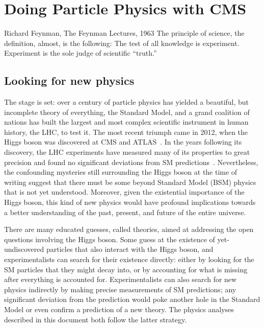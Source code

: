 \chapter{Doing Particle Physics with CMS}
\begin{aquote}{Richard Feynman, The Feynman Lectures, 1963}
The principle of science, the definition, almost, is the following: The test of all knowledge is experiment. 
Experiment is the sole judge of scientific ``truth.''
\end{aquote}

\section{Looking for new physics}
The stage is set: over a century of particle physics has yielded a beautiful, but incomplete theory of everything, the Standard Model, and a grand coalition of nations has built the largest and most complex scientific instrument in human history, the LHC, to test it. 
The most recent triumph came in 2012, when the Higgs boson was discovered at CMS and ATLAS~\cite{CMSdisc, ATLASdisc}. 
In the years following its discovery, the LHC experiments have measured many of its properties to great precision and found no significant deviations from SM predictions~\cite{NatureHiggsCMS2022, NatureHiggsATLAS2022}. 
Nevertheless, the confounding mysteries still surrounding the Higgs boson at the time of writing suggest that there must be some beyond Standard Model (BSM) physics that is not yet understood. 
Moreover, given the existential importance of the Higgs boson, this kind of new physics would have profound implications towards a better understanding of the past, present, and future of the entire universe. 

There are many educated guesses, called theories, aimed at addressing the open questions involving the Higgs boson. 
Some guess at the existence of yet-undiscovered particles that also interact with the Higgs boson\footnotemark{}, and experimentalists can search for their existence directly: either by looking for the SM particles that they might decay into, or by accounting for what is missing after everything is accounted for. 
Experimentalists can also search for new physics indirectly by making precise measurements of SM predictions; any significant deviation from the prediction would poke another hole in the Standard Model or even confirm a prediction of a new theory. 
The physics analyses described in this document both follow the latter strategy.

